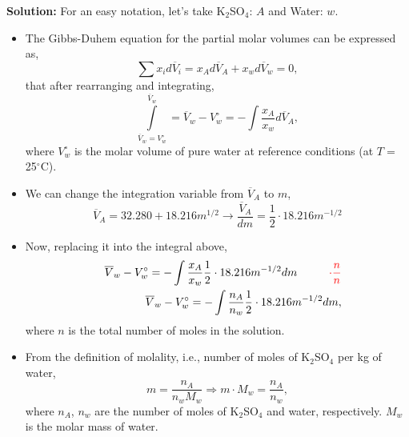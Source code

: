 \documentclass[12pts,a4paper,amsmath,amssymb,floatfix]{article}%
\newcommand{\frc}{\displaystyle\frac}
\newcommand{\red}{\textcolor{red}}
\begin{document}
\begin{enumerate}[label=\bfseries Example \arabic*]
{\bf Solution:} For an easy notation, let's take K$_{2}$SO$_{4}$: $A$ and Water: $w$.
\begin{itemize}
  \item The Gibbs-Duhem equation for the partial molar volumes can be expressed as,
     \begin{displaymath}
        \sum\limits x_{i}d\overline{V}_{i} = x_{A} d\overline{V}_{A} + x_{w} d\overline{V}_{w} = 0,
     \end{displaymath}
     that after rearranging and integrating,
     \begin{displaymath}
        \int\limits_{\overline{V}_{w}=V_{w}^{\circ}}^{\overline{V}_{w}} = \overline{V}_{w} - V_{w}^{\circ} = -\int\frc{x_{A}}{x_{w}} d\overline{V}_{A},
     \end{displaymath}
     where $V_{w}^{\circ}$ is the molar volume of pure water at reference conditions (at $T=$ 25$^{\circ}$C).

  \item We can change the integration variable from $\overline{V}_{A}$ to $m$,
      \begin{displaymath}
         \overline{V}_{A} = 32.280 + 18.216 m^{1/2} \rightarrow \frc{\overline{V}_{A}}{dm} = \frc{1}{2}\cdot 18.216 m^{-1/2} 
      \end{displaymath} 
  
  \item Now, replacing it into the integral above,
       \begin{eqnarray}
          && \overline{V}_{w} - V_{w}^{\circ} = -\int\frc{x_{A}}{x_{w}} \frc{1}{2}\cdot 18.216 m^{-1/2} dm \hspace{1cm} \red{\cdot\frc{n}{n}} \nonumber \\
          && \overline{V}_{w} - V_{w}^{\circ} = -\int\frc{n_{A}}{n_{w}} \frc{1}{2}\cdot 18.216 m^{-1/2} dm, \label{example4:eqn1}
       \end{eqnarray}
       where $n$ is the total number of moles in the solution.

  \item From the definition of molality, i.e., number of moles of K$_{2}$SO$_{4}$ per kg of water,
       \begin{displaymath}
           m = \frc{n_{A}}{n_{w}M_{w}} \Longrightarrow m\cdot M_{w} = \frc{n_{A}}{n_{w}},
       \end{displaymath}
       where $n_{A}$, $n_{w}$ are the number of moles of K$_{2}$SO$_{4}$ and water, respectively. $M_{w}$ is the molar mass of water.


\end{itemize}
\end{enumerate}
\end{document}
